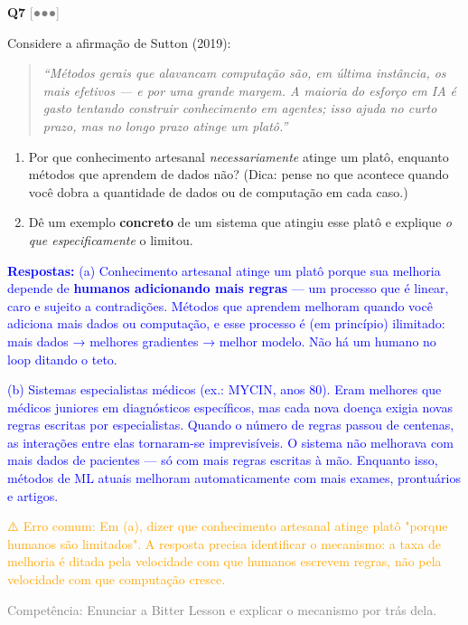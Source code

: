 \documentclass[12pt,a4paper]{article}
\newcommand{\sol}[1]{\textcolor{blue}{#1}}
\newcommand{\errocomum}[1]{\textcolor{orange}{⚠️ Erro comum: #1}}
\newcommand{\competencia}[1]{\textcolor{gray}{Competência: #1}}
\newcommand{\sol}[1]{}
\newcommand{\errocomum}[1]{}
\newcommand{\competencia}[1]{}
\newcommand{\sol}[1]{}
\newcommand{\errocomum}[1]{}
\newcommand{\competencia}[1]{}
\newcommand{\nivel}[1]{\textcolor{gray}{[#1]}}
\newenvironment{questao}[2]{
  \vspace{0.5cm}
  \noindent\textbf{Q#1} \nivel{#2} \quad
}{
  \vspace{0.2cm}
}
\begin{document}
\begin{questao}{7}{●●●}
  Considere a afirmação de Sutton (2019):

  \begin{quote}
  \textit{``Métodos gerais que alavancam computação são, em última instância,
  os mais efetivos — e por uma grande margem. A maioria do esforço em IA é
  gasto tentando construir conhecimento em agentes; isso ajuda no curto prazo,
  mas no longo prazo atinge um platô.''}
  \end{quote}

  \begin{enumerate}[label=(\alph*),nosep]
    \item Por que conhecimento artesanal \textit{necessariamente} atinge um platô,
    enquanto métodos que aprendem de dados não? (Dica: pense no que acontece quando
    você dobra a quantidade de dados ou de computação em cada caso.)
    \item Dê um exemplo \textbf{concreto} de um sistema que atingiu esse platô e
    explique \textit{o que especificamente} o limitou.
  \end{enumerate}

  \sol{
    \textbf{Respostas:}
    (a) Conhecimento artesanal atinge um platô porque sua melhoria depende de \textbf{humanos
    adicionando mais regras} — um processo que é linear, caro e sujeito a contradições.
    Métodos que aprendem melhoram quando você adiciona mais dados ou computação, e esse
    processo é (em princípio) ilimitado: mais dados → melhores gradientes → melhor modelo.
    Não há um humano no loop ditando o teto.

    (b) Sistemas especialistas médicos (ex.: MYCIN, anos 80). Eram melhores que médicos
    juniores em diagnósticos específicos, mas cada nova doença exigia novas regras escritas
    por especialistas. Quando o número de regras passou de centenas, as interações entre
    elas tornaram-se imprevisíveis. O sistema não melhorava com mais dados de pacientes —
    só com mais regras escritas à mão. Enquanto isso, métodos de ML atuais melhoram
    automaticamente com mais exames, prontuários e artigos.

    \errocomum{Em (a), dizer que conhecimento artesanal atinge platô "porque humanos
    são limitados". A resposta precisa identificar o mecanismo: a taxa de melhoria é
    ditada pela velocidade com que humanos escrevem regras, não pela velocidade com
    que computação cresce.}

    \competencia{Enunciar a Bitter Lesson e explicar o mecanismo por trás dela.}
  }
\end{questao}
\end{document}
